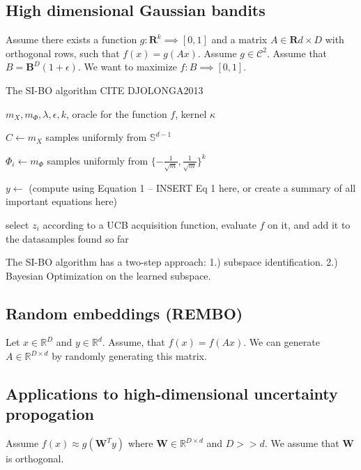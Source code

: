 
\subsection{High dimensional Gaussian bandits}

\citep{Djolonga2013} Assume there exists a function $g : \mathbf{R}^k \implies [0, 1]$ and a matrix $A \in \mathbf{R}{d \times D}$ with orthogonal rows, such that $f(x) = g(Ax) $. Assume $g \in \mathcal{C}^2$. 
Assume that $B = \mathbf{B}^D (1 + \epsilon ) $.
We want to maximize $f: B \implies [0, 1] $.\\

\begin{algorithm}
\caption{The SI-BO algorithm CITE DJOLONGA2013}

\begin{algorithmic} 
\REQUIRE $m_X, m_{\Phi}, \lambda, \epsilon, k$, oracle for the function $f$, kernel $\kappa$ 

\STATE $C \leftarrow m_X $ samples uniformly from $\mathbb{S}^{d-1}$

\STATE $\Phi_i \leftarrow m_{\Phi}$ samples uniformly from $\{ -\frac{1}{\sqrt{m}}, \frac{1}{\sqrt{m}} \}^k$
\ENDFOR

\STATE $ y \leftarrow $ (compute using Equation 1 -- INSERT Eq 1 here, or create a summary of all important equations here)

\STATE select $z_i$ according to a UCB acquisition function, evaluate $f$ on it, and add it to the datasamples found so far

\end{algorithmic}

\end{algorithm}

The SI-BO algorithm has a two-step approach:
1.) subspace identification.
2.) Bayesian Optimization on the learned subspace.


\subsection{Random embeddings (REMBO)}
\citep{Wang2013} Let $x \in \mathbb{R}^D$ and $y \in \mathbb{R}^d$. Assume, that $f(x) = f(Ax)$. We can generate $A \in \mathbb{R}^{D \times d}$ by randomly generating this matrix.

\subsection{Applications to high-dimensional uncertainty propogation}
\citep{Tripathy} Assume $f(x) \approx g( \mathbf{W}^T y)$ where $ \mathbf{W} \in \mathbb{R}^{D \times d} $ and $D >> d$.
We assume that $ \mathbf{W} $ is orthogonal.

